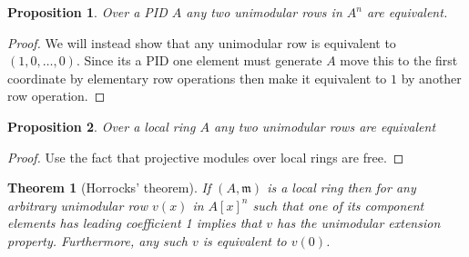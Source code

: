 \documentclass[12pt]{article}
\numberwithin{equation}{section}
\newtheorem{theorem}{Theorem}[section]
\newtheorem{proposition}{Proposition}[section]
\begin{document}
	\begin{proposition}\label{inductionbaseforprequillensuslin}
		Over a PID $A$ any two unimodular rows in $A^n$ are equivalent.
	\end{proposition}
	\begin{proof}
		We will instead show that any unimodular row is equivalent to $(1,0,\dots, 0)$. Since its a PID one element must generate $A$ move this to the first coordinate by elementary row operations then make it equivalent to $1$ by another row operation.
	\end{proof}
	\begin{proposition}
		Over a local ring $A$ any two unimodular rows are equivalent
	\end{proposition}
	\begin{proof}
		Use the fact that projective modules over local rings are free.
	\end{proof}
	\begin{theorem}[Horrocks' theorem]
	If $(A, \mathfrak{m})$ is a local ring then for any arbitrary unimodular row $v(x)$ in $A[x]^n$ such that one of its component elements has leading coefficient 1 implies that $v$ has the unimodular extension property. Furthermore, any such $v$ is equivalent to $v(0)$.
	\end{theorem}
\end{document}
